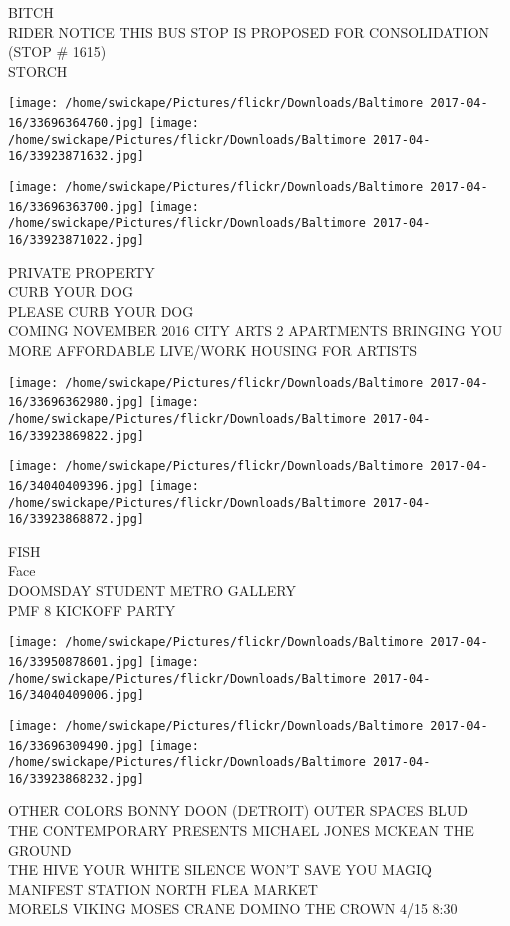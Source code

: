\documentclass[10pt,letterpaper]{article}
\begin{document}
BITCH\\
RIDER NOTICE THIS BUS STOP IS PROPOSED FOR CONSOLIDATION (STOP \# 1615)\\
STORCH
\pagebreak

\texttt{[image: /home/swickape/Pictures/flickr/Downloads/Baltimore 2017-04-16/33696364760.jpg]}
\texttt{[image: /home/swickape/Pictures/flickr/Downloads/Baltimore 2017-04-16/33923871632.jpg]}

\texttt{[image: /home/swickape/Pictures/flickr/Downloads/Baltimore 2017-04-16/33696363700.jpg]}
\texttt{[image: /home/swickape/Pictures/flickr/Downloads/Baltimore 2017-04-16/33923871022.jpg]}

PRIVATE PROPERTY\\
CURB YOUR DOG\\
PLEASE CURB YOUR DOG\\
COMING NOVEMBER 2016 CITY ARTS 2 APARTMENTS BRINGING YOU MORE AFFORDABLE LIVE/WORK HOUSING FOR ARTISTS
\pagebreak

\texttt{[image: /home/swickape/Pictures/flickr/Downloads/Baltimore 2017-04-16/33696362980.jpg]}
\texttt{[image: /home/swickape/Pictures/flickr/Downloads/Baltimore 2017-04-16/33923869822.jpg]}

\texttt{[image: /home/swickape/Pictures/flickr/Downloads/Baltimore 2017-04-16/34040409396.jpg]}
\texttt{[image: /home/swickape/Pictures/flickr/Downloads/Baltimore 2017-04-16/33923868872.jpg]}

FISH\\
Face\\
DOOMSDAY STUDENT METRO GALLERY\\
PMF 8 KICKOFF PARTY
\pagebreak

\texttt{[image: /home/swickape/Pictures/flickr/Downloads/Baltimore 2017-04-16/33950878601.jpg]}
\texttt{[image: /home/swickape/Pictures/flickr/Downloads/Baltimore 2017-04-16/34040409006.jpg]}

\texttt{[image: /home/swickape/Pictures/flickr/Downloads/Baltimore 2017-04-16/33696309490.jpg]}
\texttt{[image: /home/swickape/Pictures/flickr/Downloads/Baltimore 2017-04-16/33923868232.jpg]}

OTHER COLORS BONNY DOON (DETROIT) OUTER SPACES BLUD\\
THE CONTEMPORARY PRESENTS MICHAEL JONES MCKEAN THE GROUND\\
THE HIVE YOUR WHITE SILENCE WON'T SAVE YOU MAGIQ MANIFEST STATION NORTH FLEA MARKET\\
MORELS VIKING MOSES CRANE DOMINO THE CROWN 4/15 8:30
\pagebreak
\end{document}
